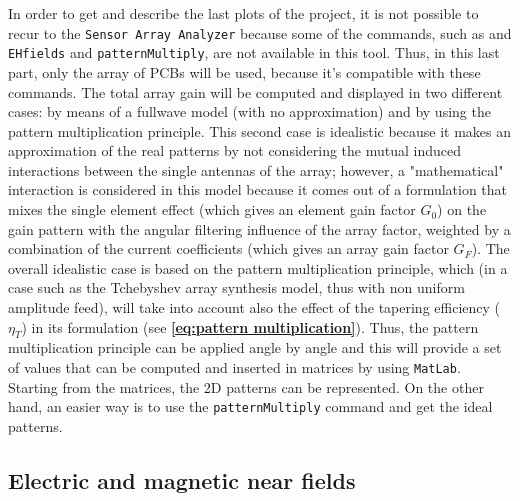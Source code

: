 \documentclass[10pt,a4paper,twocolumn]{article}
\begin{document}
{In order to get and describe the last plots of the project, it is not possible to recur to the \texttt{\color{Mahogany}Sensor Array Analyzer} because some of the commands, such as  and \texttt{\color{Turquoise}EHfields} and \texttt{\color{Turquoise}patternMultiply}, are not available in this tool. Thus, in this last part, only the array of PCBs will be used, because it's compatible with these commands. The total array gain will be computed and displayed in two different cases: by means of a fullwave model (with no approximation) and by using the pattern multiplication principle. This second case is idealistic because it makes an approximation of the real patterns by not considering the mutual induced interactions between the single antennas of the array; however, a "mathematical" interaction is considered in this model because it comes out of a formulation that mixes the single element effect (which gives an element gain factor $G_0$) on the gain pattern with the angular filtering influence of the array factor, weighted by a combination of the current coefficients (which gives an array gain factor $G_F$). The overall idealistic case is based on the pattern multiplication principle, which (in a case such as the Tchebyshev array synthesis model, thus with non uniform amplitude feed), will take into account also the effect of the tapering efficiency ($\eta_T$) in its formulation (see \textbf{\cref{eq:pattern multiplication}}). Thus, the pattern multiplication principle can be applied angle by angle and this will provide a set of values that can be computed and inserted in matrices by using \texttt{\color{BurntOrange}MatLab}. Starting from the matrices, the 2D patterns can be represented. On the other hand, an easier way is to use the \texttt{\color{Turquoise}patternMultiply} command and get the ideal patterns. 


\subsection*{Electric and magnetic near fields}



}
\end{document}

